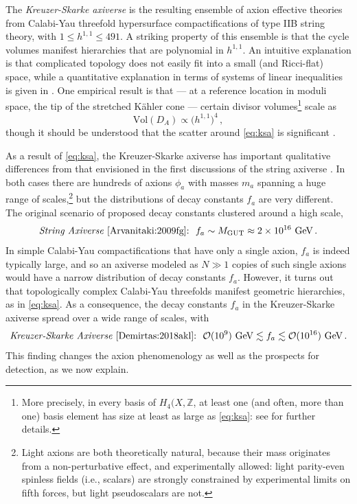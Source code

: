 \documentclass[12pt,a4wide]{article}
\begin{document}
The \emph{Kreuzer-Skarke axiverse} \cite{Demirtas:2018akl} is the resulting ensemble of axion effective theories from
Calabi-Yau threefold hypersurface compactifications of type IIB string theory, with $1 \le h^{1,1} \le 491$.
A striking property of this ensemble is that the cycle volumes manifest hierarchies that are polynomial in $h^{1,1}$.  An intuitive explanation is that complicated topology does not easily fit into a small (and Ricci-flat) space, while a quantitative explanation in terms of systems of linear inequalities is given in \cite{Demirtas:2018akl}. 
One empirical result is that --- at a reference location in moduli space, the tip of the stretched K\"ahler cone 
--- certain 
divisor volumes\footnote{More precisely, in every basis of $H_4(X,\mathbb{Z}$, at least one (and often, more than one) basis element has size at least as large as \eqref{eq:ksa}: see \cite{Demirtas:2018akl} for further details.}  scale as
\begin{equation}\label{eq:ksa}
\text{Vol}(D_A) \propto \bigl(h^{1,1}\bigr)^4\,,
\end{equation} though it should be understood that the scatter around \eqref{eq:ksa} is significant \cite{Demirtas:2018akl}.
 
As a result of \eqref{eq:ksa}, the Kreuzer-Skarke axiverse has important qualitative differences from that envisioned in the first discussions of the string axiverse \cite{Arvanitaki:2009fg}.
In both cases there are hundreds of axions $\phi_a$ with masses $m_a$ spanning a huge range of scales,\footnote{Light axions are both theoretically natural, because their mass originates from a non-perturbative effect, and experimentally allowed: 
light parity-even spinless fields (i.e., scalars) are strongly constrained by experimental limits on fifth forces, but light pseudoscalars are not.} but the distributions of decay constants $f_a$ are very different.
The original scenario of \cite{Arvanitaki:2009fg} proposed decay constants clustered around a high scale, 
\begin{equation}
  \text{{\emph{String Axiverse}}~\cite{Arvanitaki:2009fg}:~~}  f_a \sim M_{\text{GUT}} \approx 2 \times 10^{16}~\text{GeV}\,.
\end{equation}
In simple Calabi-Yau compactifications that have only a single axion, $f_a$ is indeed typically large,
and so an axiverse modeled as $N \gg 1$ copies of such single axions would have a narrow distribution of decay constants $f_a$.  However, it turns out that topologically complex Calabi-Yau threefolds manifest geometric hierarchies, as in \eqref{eq:ksa}.
As a consequence, the decay constants $f_a$ in the Kreuzer-Skarke axiverse spread over a wide range of scales, with 
\begin{equation}\label{eq:frange}
 \text{{\emph{Kreuzer-Skarke Axiverse}}~\cite{Demirtas:2018akl}:~~}   \mathcal{O}(10^9)~\text{GeV} \lesssim f_a \lesssim \mathcal{O}(10^{16})~\text{GeV}\,.
\end{equation} This finding changes the axion phenomenology as well as the prospects for detection, as we now explain.
 
\end{document}

